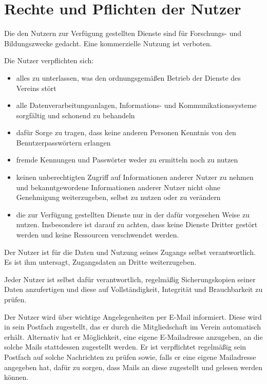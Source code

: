 \documentclass[a4paper,10pt]{scrartcl}
\begin{document}
\section{Rechte und Pflichten der Nutzer}
Die den Nutzern zur Verfügung gestellten Dienste sind für Forschungs- und Bildungszwecke gedacht. Eine kommerzielle Nutzung ist verboten.

Die Nutzer verpflichten sich:

\begin{itemize}
        \item alles zu unterlassen, was den ordnungsgemäßen Betrieb der Dienste des Vereins stört
        \item alle Datenverarbeitungsanlagen, Informations- und Kommunikationssysteme sorgfältig und schonend zu behandeln
        \item dafür Sorge zu tragen, dass keine anderen Personen Kenntnis von den Benutzerpasswörtern erlangen
        \item fremde Kennungen und Passwörter weder zu ermitteln noch zu nutzen
        \item keinen unberechtigten Zugriff auf Informationen anderer Nutzer zu nehmen und bekanntgewordene Informationen anderer Nutzer nicht ohne Genehmigung weiterzugeben, selbst zu nutzen oder zu verändern
        \item die zur Verfügung gestellten Dienste nur in der dafür vorgesehen Weise zu nutzen. Insbesondere ist darauf zu achten, dass keine Dienste Dritter gestört werden und keine Ressourcen verschwendet werden. 
\end{itemize}

Der Nutzer ist für die Daten und Nutzung seines Zugangs selbst verantwortlich. Es ist ihm untersagt, Zugangsdaten an Dritte weiterzugeben.

Jeder Nutzer ist selbst dafür verantwortlich, regelmäßig Sicherungskopien seiner Daten anzufertigen und diese auf Vollständigkeit, Integrität und Brauchbarkeit zu prüfen.

Der Nutzer wird über wichtige Angelegenheiten per E-Mail informiert. Diese wird in sein Postfach zugestellt, das er durch die Mitgliedschaft im Verein automatisch erhält. Alternativ hat er Möglichkeit, eine eigene E-Mailadresse anzugeben, an die solche Mails stattdessen zugestellt werden. Er ist verpflichtet regelmäßig sein Postfach auf solche Nachrichten zu prüfen sowie, falls er eine eigene Mailadresse angegeben hat, dafür zu sorgen, dass Mails an diese zugestellt und gelesen werden können. 
\end{document}
